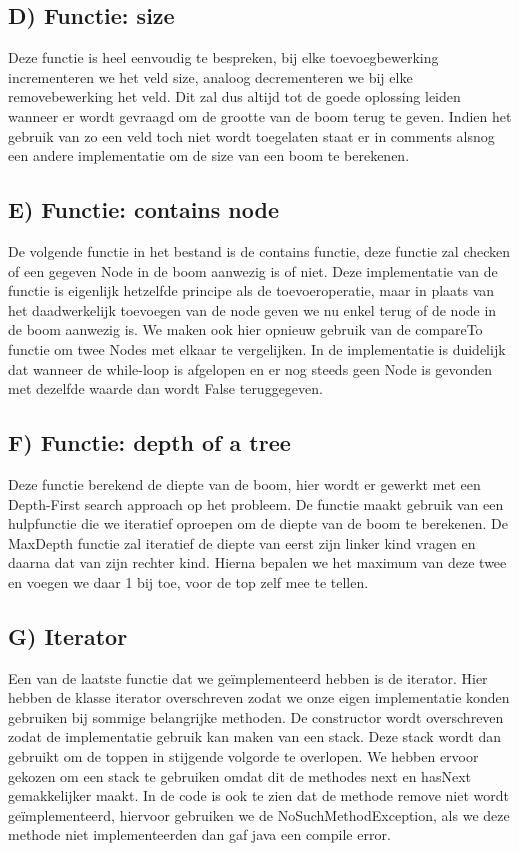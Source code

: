 \documentclass[dutch, 11pt]{report}
\begin{document}
\subsection*{D) Functie: size}
Deze functie is heel eenvoudig te bespreken, bij elke toevoegbewerking incrementeren we het veld size, analoog decrementeren we bij elke removebewerking het veld. Dit zal dus altijd tot de goede oplossing leiden wanneer er wordt gevraagd om de grootte van de boom terug te geven. Indien het gebruik van zo een veld toch niet wordt toegelaten staat er in comments alsnog een andere implementatie om de size van een boom te berekenen.

\subsection*{E) Functie: contains node}
De volgende functie in het bestand is de contains functie, deze functie zal checken of een gegeven Node in de boom aanwezig is of niet. Deze implementatie van de functie is eigenlijk hetzelfde principe als de toevoeroperatie, maar in plaats van het daadwerkelijk toevoegen van de node geven we nu enkel terug of de node in de boom aanwezig is. We maken ook hier opnieuw gebruik van de compareTo functie om twee Nodes met elkaar te vergelijken. In de implementatie is duidelijk dat wanneer de while-loop is afgelopen en er nog steeds geen Node is gevonden met dezelfde waarde dan wordt False teruggegeven.

\subsection*{F) Functie: depth of a tree}
Deze functie berekend de diepte van de boom, hier wordt er gewerkt met een Depth-First search approach op het probleem. De functie maakt gebruik van een hulpfunctie die we iteratief oproepen om de diepte van de boom te berekenen. De MaxDepth functie zal iteratief de diepte van eerst zijn linker kind vragen en daarna dat van zijn rechter kind. Hierna bepalen we het maximum van deze twee en voegen we daar 1 bij toe, voor de top zelf mee te tellen.

\subsection*{G) Iterator}
Een van de laatste functie dat we geïmplementeerd hebben is de iterator. Hier hebben de klasse iterator overschreven zodat we onze eigen implementatie konden gebruiken bij sommige belangrijke methoden. De constructor wordt overschreven zodat de implementatie gebruik kan maken van een stack. Deze stack wordt dan gebruikt om de toppen in stijgende volgorde te overlopen. We hebben ervoor gekozen om een stack te gebruiken omdat dit de methodes next en hasNext gemakkelijker maakt. In de code is ook te zien dat de methode remove niet wordt geïmplementeerd, hiervoor gebruiken we de NoSuchMethodException, als we deze methode niet implementeerden dan gaf java een compile error.
\end{document}
